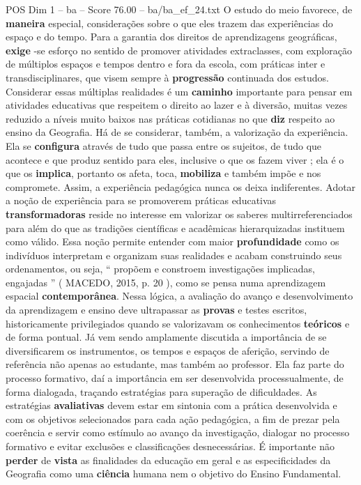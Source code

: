 \begin{textsample}{POS Dim 1 – ba – Score 76.00 – ba/ba\_ef\_24.txt}
O estudo do meio favorece, de \textbf{maneira} especial, considerações sobre o que eles trazem das experiências do espaço e do tempo.
Para a garantia dos direitos de aprendizagens geográficas, \textbf{exige} -se esforço no sentido de promover atividades extraclasses, com exploração de múltiplos espaços e tempos dentro e fora da escola, com práticas inter e transdisciplinares, que visem sempre à \textbf{progressão} continuada dos estudos.
Considerar essas múltiplas realidades é um \textbf{caminho} importante para pensar em atividades educativas que respeitem o direito ao lazer e à diversão, muitas vezes reduzido a níveis muito baixos nas práticas cotidianas no que \textbf{diz} respeito ao ensino da Geografia.
Há de se considerar, também, a valorização da experiência.
Ela se \textbf{configura} através de tudo que passa entre os sujeitos, de tudo que acontece e que produz sentido para eles, inclusive o que os fazem viver ; ela é o que os \textbf{implica}, portanto os afeta, toca, \textbf{mobiliza} e também impõe e nos compromete.
Assim, a experiência pedagógica nunca os deixa indiferentes.
Adotar a noção de experiência para se promoverem práticas educativas \textbf{transformadoras} reside no interesse em valorizar os saberes multirreferenciados para além do que as tradições científicas e acadêmicas hierarquizadas instituem como válido.
Essa noção permite entender com maior \textbf{profundidade} como os indivíduos interpretam e organizam suas realidades e acabam construindo seus ordenamentos, ou seja, “ propõem e constroem investigações implicadas, engajadas ” ( MACEDO, 2015, p. 20 ), como se pensa numa aprendizagem espacial \textbf{contemporânea}.
Nessa lógica, a avaliação do avanço e desenvolvimento da aprendizagem e ensino deve ultrapassar as \textbf{provas} e testes escritos, historicamente privilegiados quando se valorizavam os conhecimentos \textbf{teóricos} e de forma pontual.
Já vem sendo amplamente discutida a importância de se diversificarem os instrumentos, os tempos e espaços de aferição, servindo de referência não apenas ao estudante, mas também ao professor.
Ela faz parte do processo formativo, daí a importância em ser desenvolvida processualmente, de forma dialogada, traçando estratégias para superação de dificuldades.
As estratégias \textbf{avaliativas} devem estar em sintonia com a prática desenvolvida e com os objetivos selecionados para cada ação pedagógica, a fim de prezar pela coerência e servir como estímulo ao avanço da investigação, dialogar no processo formativo e evitar exclusões e classificações desnecessárias.
É importante não \textbf{perder} de \textbf{vista} as finalidades da educação em geral e as especificidades da Geografia como uma \textbf{ciência} humana nem o objetivo do Ensino Fundamental.


\end{textsample}
